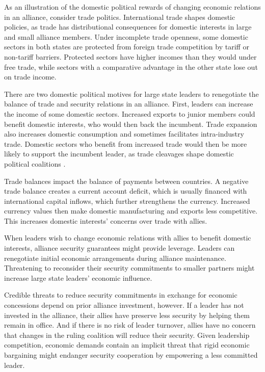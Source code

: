 \documentclass[12pt]{article}
\begin{document}
As an illustration of the domestic political rewards of changing economic relations in an alliance, consider trade politics.
International trade shapes domestic policies, as trade has distributional consequences for domestic interests in large and small alliance members.
Under incomplete trade openness, some domestic sectors in both states are protected from foreign trade competition by tariff or non-tariff barriers. 
Protected sectors have higher incomes than they would under free trade, while sectors with a comparative advantage in the other state lose out on trade income. 


There are two domestic political motives for large state leaders to renegotiate the balance of trade and security relations in an alliance. 
First, leaders can increase the income of some domestic sectors.
Increased exports to junior members could benefit domestic interests, who would then back the incumbent. 
Trade expansion also increases domestic consumption and sometimes facilitates intra-industry trade.
Domestic sectors who benefit from increased trade would then be more likely to support the incumbent leader, as trade cleavages shape domestic political coalitions \citep{Rogowski1987, Hiscox2001}. 
 

Trade balances impact the balance of payments between countries.
A negative trade balance creates a current account deficit, which is usually financed with international capital inflows, which further strengthens the currency. 
Increased currency values then make domestic manufacturing and exports less competitive. 
This increases domestic interests' concerns over trade with allies. 


When leaders wish to change economic relations with allies to benefit domestic interests, alliance security guarantees might provide leverage. 
Leaders can renegotiate initial economic arrangements during alliance maintenance. 
Threatening to reconsider their security commitments to smaller partners might increase large state leaders' economic influence. 


Credible threats to reduce security commitments in exchange for economic concessions depend on prior alliance investment, however. 
If a leader has not invested in the alliance, their allies have preserve less security by helping them remain in office. 
And if there is no risk of leader turnover, allies have no concern that changes in the ruling coalition will reduce their security. 
Given leadership competition, economic demands contain an implicit threat that rigid economic bargaining might endanger security cooperation by empowering a less committed leader.
\end{document}
